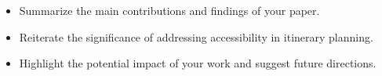 \begin{itemize}
        \item Summarize the main contributions and findings of your paper.
        \item Reiterate the significance of addressing accessibility in itinerary planning.
        \item Highlight the potential impact of your work and suggest future directions.
    \end{itemize}